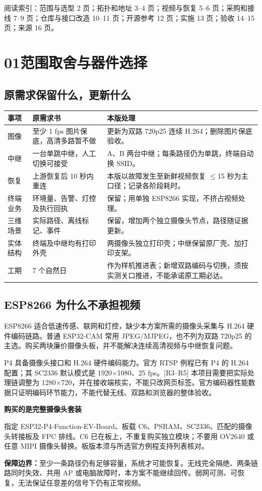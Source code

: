 \documentclass[UTF8,a4paper,11pt,fontset=windows]{ctexart}
\newcommand{\page}[2]{\clearpage\section*{#1\quad #2}\addcontentsline{toc}{section}{#1 #2}}
\newcommand{\note}[2]{\begin{tcolorbox}[colback=pale,colframe=teal!30,boxrule=0.5pt,arc=1mm,left=9pt,right=9pt,top=7pt,bottom=7pt]\textbf{\color{navy}#1}\par #2\end{tcolorbox}}
\begin{document}
{\small\color{muted}阅读索引：范围与选型 2 页；拓扑和地址 3--4 页；视频与恢复 5--6 页；采购和接线 7--9 页；仓库与接口改造 10--11 页；开源参考 12 页；实施 13 页；验收 14--15 页；来源 16 页。}

\page{01}{范围取舍与器件选择}
\subsection*{原需求保留什么，更新什么}
\par\noindent\begin{tabularx}{\linewidth}{@{}p{30mm}Y Y@{}}\toprule
事项 & 原需求书 & 本版处理 \\\midrule
图像 & 至少 1 fps 图片保底，高清多路暂不做 & 更新为双路 720p25 连续 H.264；删除图片保底验收。\\
中继 & 一台单跳中继，人工切换可接受 & A、B 两台中继；每条路径仍为单跳，终端自动换 SSID。\\
恢复 & 上游恢复后 10 秒内重连 & 本版以故障发生至新鲜视频恢复 \(\leq\)15 秒为主口径；记录各阶段耗时。\\
终端业务 & 环境量、告警、灯控及执行回执 & 保留；用单独 ESP8266 实现，不挤占视频处理。\\
三维场景 & 实际路径、离线标记、事件 & 保留，增加两个独立摄像头节点，路径随证据更新。\\
实体结构 & 终端及中继均有打印外壳 & 两摄像头独立打印壳；中继保留原厂壳、加打印支架。\\
工期 & 7 个自然日 & 作为样机推进表；新增双路编码与切换，须按实测关口推进，不能承诺原工期必达。\\\bottomrule
\end{tabularx}\par
\subsection*{ESP8266 为什么不承担视频}
ESP8266 适合低速传感、联网和灯控，缺少本方案所需的摄像头采集与 H.264 硬件编码链路。普通 ESP32-CAM 常用 JPEG/MJPEG，也不列为双路 720p25 的主选。购买两块廉价摄像头板，并不能解决连续高清视频与中继恢复问题。

P4 具备摄像头接口和 H.264 硬件编码能力。官方 RTSP 例程已有 P4 的 H.264 配置；其 SC2336 默认模式是 1920×1080、25 fps。[R3--R5] 本项目需要把实际处理链调整为 1280×720，并在接收端核实，不能只改网页标签。官方编码器性能数据只证明编码环节能力，不能代替无线、双路和浏览器的整体验收。
\note{购买的是完整摄像头套装}{指定 ESP32-P4-Function-EV-Board、板载 C6、PSRAM、SC2336、匹配的摄像头转接板及 FPC 排线。C6 已在板上，不重复购买独立模块；不要用 OV2640 或任意 MIPI 摄像头替换。板版本须与所选官方例程支持列表核对。}
\textbf{保障边界：}至少一条路径仍有足够容量，系统才可能恢复。无线完全隔绝、两条链路同时失效、共用 AP 或电脑故障时，本方案不能继续回传。弱网可测、可恢复，无法保证任意差的信号下仍有正常视频。
\end{document}
